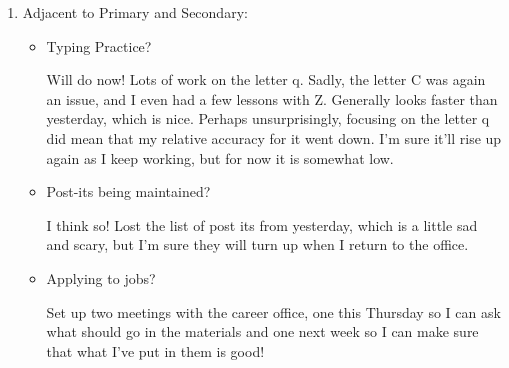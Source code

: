 \documentclass[12pt]{article}
\newcommand{\say}[1]{``#1''}
\renewcommand{\,}{\textsuperscript{,}}
\begin{document}
\begin{enumerate}
\begin{itemize}
\begin{itemize}
\item Being honest?

Generally! It was really weird to write with my friend this morning and find that they were so willing to be helpful.\footnote{I often comment things like \say{alas I do not have my backpack} as a way of externalizing that I need to get the backpack at some point. Friend just got the backpack, which I think felt bad to me because it made me feel like I was being passive aggressive?}

\item Being open?

Yeah! I think it's funny that I separate these two, because one would hope that they're synonymous, and in my mind they certainly approach it.  
However, there's some part of me that reacts to the words differently, so I'll leave it for now.

\item Being appropriately vulnerable?

Yeah!

\end{itemize}

\end{itemize}

\item Adjacent to Primary and Secondary:

\begin{itemize}

\item Typing Practice?

Will do now!  
Lots of work on the letter q. Sadly, the letter C was again an issue, and I even had a few lessons with Z. Generally looks faster than yesterday, which is nice.  
Perhaps unsurprisingly, focusing on the letter q did mean that my relative accuracy for it went down. I'm sure it'll rise up again as I keep working, but for now it is somewhat low.

\item Post-its being maintained?

I think so! Lost the list of post its from yesterday, which is a little sad and scary, but I'm sure they will turn up when I return to the office.

\item Applying to jobs?

Set up two meetings with the career office, one this Thursday so I can ask what should go in the materials and one next week so I can make sure that what I've put in them is good!


\end{itemize}
\end{enumerate}
\end{document}
